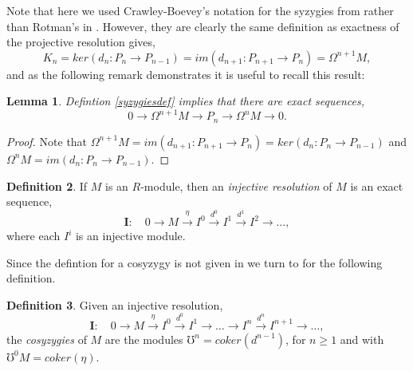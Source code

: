 \documentclass[11.5pt, twoside, a4paper, titlepage]{report}
\theoremstyle{definition}
\newtheorem{mydef}{Definition}[section]
\theoremstyle{plain}
\newtheorem{lem}[mydef]{Lemma}
\begin{document}
Note that here we used Crawley-Boevey's notation for the syzygies from \cite{CB1} rather than Rotman's in \cite{Rotman}. However, they are clearly the same definition as exactness of the projective resolution gives,
\begin{equation*}
K_n=ker(d_n:P_n \to P_{n-1}) = im(d_{n+1}:P_{n+1} \to P_n)=\Omega^{n+1}M,
\end{equation*}
and as the following remark demonstrates it is useful to recall this result:

\begin{lem} \label{syzygylem}
Defintion \ref{syzygiesdef} implies that there are exact sequences,
\begin{equation*}
0 \xrightarrow{} \Omega^{n+1}M \xrightarrow{} P_n \xrightarrow{} \Omega^nM \xrightarrow{} 0.
\end{equation*}
\end{lem}
\begin{proof}
Note that $\Omega^{n+1}M=im(d_{n+1}:P_{n+1} \to P_n)=ker(d_n:P_n \to P_{n-1})$ and $\Omega^nM=im(d_n:P_n \to P_{n-1})$.
\end{proof}

\begin{mydef}
If $M$ is an $R$-module, then an \emph{injective resolution} of $M$ is an exact sequence, 
\begin{equation*}
\mathbf{I}: \quad 0 \xrightarrow{}M \xrightarrow{\eta}I^0 \xrightarrow{d^0} I^1 \xrightarrow{d^1} I^2 \xrightarrow{} \dots,
\end{equation*}
where each $I^i$ is an injective module.
\end{mydef}

Since the defintion for a cosyzygy is not given in \cite{CB1} we turn to \cite{Rotman} for the following definition.

\begin{mydef}
Given an injective resolution,
\begin{equation*}
\mathbf{I}: \quad  0 \xrightarrow{} M \xrightarrow{\eta} I^0 \xrightarrow{d^0} I^1 \xrightarrow{} \dots \xrightarrow{} I^n \xrightarrow{d^n} I^{n+1} \xrightarrow{} \dots,
\end{equation*}
the \emph{cosyzygies} of $M$ are the modules $\mho^n=coker(d^{n-1})$, for $n\geq 1$ and with $\mho^0M=coker(\eta)$.
\end{mydef}
\end{document}
